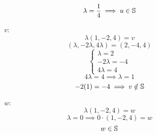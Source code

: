 \documentclass[../practica.root.tex]{subfiles}
\begin{document}
\begin{enumerate}
\begin{enumerate}
\begin{itemize}
                              \[ \lambda = \frac{1}{4} \implies u \in \S \]
                        \item[$v$:] \[ \lambda(1,-2,4) = v \]
                              \[ (\lambda, -2\lambda, 4\lambda) = (2, -4, 4) \]
                              \[
                                  \begin{cases}
                                      \lambda = 2    \\
                                      -2\lambda = -4 \\
                                      4\lambda = 4
                                  \end{cases}
                              \]
                              \[ 4\lambda = 4 \implies \lambda = 1 \]
                              \[ -2(1) = -4 \implies v \notin \S \]
                        \item[$w$:] \[ \lambda(1,-2,4) = w \]
                              \[ \lambda = 0 \implies 0\cdot(1,-2,4) = w \]
                              \[ w \in \S \]
                    \end{itemize}


\end{enumerate}
\end{enumerate}
\end{document}
